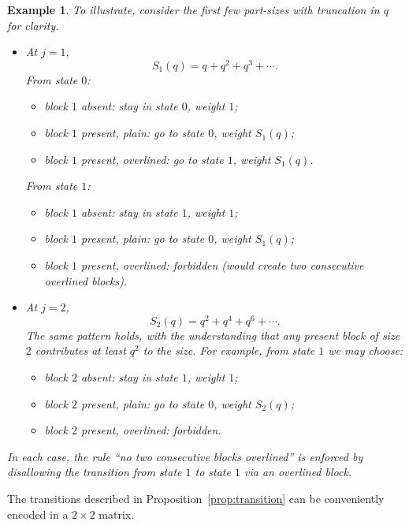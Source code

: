 \documentclass[letterpaper,12pt]{article}
\newtheorem{example}{Example}
\begin{document}
\begin{example}\label{ex:local-transitions}
To illustrate, consider the first few part-sizes with truncation in \(q\) for clarity.
\begin{itemize}
  \item At \(j=1\),
  \[
  S_1(q) = q + q^2 + q^3 + \cdots.
  \]
  From state \(0\):
  \begin{itemize}
    \item block \(1\) absent: stay in state \(0\), weight \(1\);
    \item block \(1\) present, plain: go to state \(0\), weight \(S_1(q)\);
    \item block \(1\) present, overlined: go to state \(1\), weight \(S_1(q)\).
  \end{itemize}
  From state \(1\):
  \begin{itemize}
    \item block \(1\) absent: stay in state \(1\), weight \(1\);
    \item block \(1\) present, plain: go to state \(0\), weight \(S_1(q)\);
    \item block \(1\) present, overlined: forbidden (would create two consecutive
    overlined blocks).
  \end{itemize}

  \item At \(j=2\),
  \[
  S_2(q) = q^2 + q^4 + q^6 + \cdots.
  \]
  The same pattern holds, with the understanding that any present block of size
  \(2\) contributes at least \(q^2\) to the size. For example, from state \(1\) we
  may choose:
  \begin{itemize}
    \item block \(2\) absent: stay in state \(1\), weight \(1\);
    \item block \(2\) present, plain: go to state \(0\), weight \(S_2(q)\);
    \item block \(2\) present, overlined: forbidden.
  \end{itemize}
\end{itemize}
In each case, the rule ``no two consecutive blocks overlined'' is enforced by disallowing
the transition from state \(1\) to state \(1\) via an overlined block.




\end{example}

The transitions described in  Proposition~\ref{prop:transition} can be conveniently encoded
in a \(2\times2\) matrix.
\end{document}
